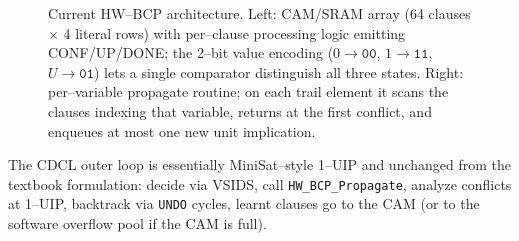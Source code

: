 \documentclass[11pt,letterpaper]{article}
\begin{document}
\begin{figure}[H]
\caption{Current HW--BCP architecture. Left: CAM/SRAM array
(64 clauses $\times$ 4 literal rows) with per--clause processing
logic emitting CONF/UP/DONE; the 2--bit value encoding
($0\!\to\!\mathtt{00}$, $1\!\to\!\mathtt{11}$, $U\!\to\!\mathtt{01}$)
lets a single comparator distinguish all three states.
Right: per--variable propagate routine; on each trail element it
scans the clauses indexing that variable, returns at the first
conflict, and enqueues at most one new unit implication.}
\label{fig:hwbcp}
\end{figure}

The CDCL outer loop is essentially MiniSat--style 1--UIP and
unchanged from the textbook formulation: decide via VSIDS, call
\texttt{HW\_BCP\_Propagate}, analyze conflicts at 1--UIP, backtrack
via \texttt{UNDO} cycles, learnt clauses go to the CAM (or to the
software overflow pool if the CAM is full).
\end{document}
